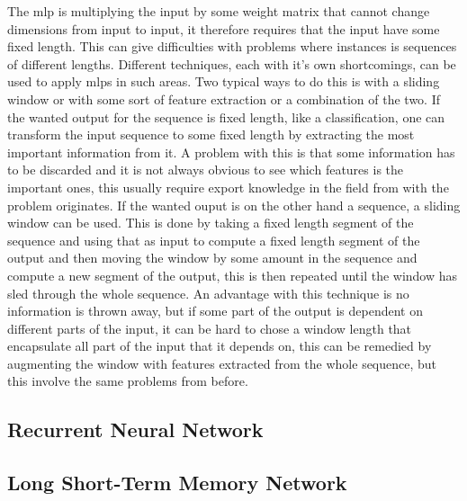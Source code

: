 The \gls{mlp} is multiplying the input by some weight matrix that cannot change dimensions from input to 
input, it therefore requires that the input have some fixed length. This can give difficulties with 
problems where instances is sequences of different lengths. Different techniques, each with it's own 
shortcomings, can be used to apply \glspl{mlp} in such areas. 
Two typical ways to do this is with a sliding window or with some sort of feature extraction or 
a combination of the two. If the wanted output for the sequence is fixed length, like a classification, 
one can transform the input sequence to some fixed length by extracting the most important information
from it. A problem with this is that some information has to be discarded and it is not always 
obvious to see which features is the important ones, this usually require export knowledge in the
field from with the problem originates. 
If the wanted ouput is on the other hand a sequence, a sliding window can be used. 
This is done by taking a fixed length segment of the sequence and using that as input to compute 
a fixed length segment of the output and then moving the window by some amount in the sequence and compute 
a new segment of the output, this is then repeated until the window has sled through the whole sequence.
An advantage with this technique is no information is thrown away, but if some part of the output is 
dependent on different parts of the input, it can be hard to chose a window length that 
encapsulate all part of the input that it depends on, this can be remedied by augmenting 
the window with features extracted from the whole sequence, but this involve the same problems 
from before.

	
\subsection{Recurrent Neural Network}



\subsection{Long Short-Term Memory Network}

